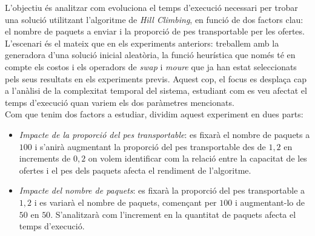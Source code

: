 \documentclass[a4paper]{article}
\begin{document}
	L'objectiu és analitzar com evoluciona el temps d'execució necessari per trobar una solució utilitzant l'algoritme de \textit{Hill Climbing}, en funció de dos factors clau: el nombre de paquets a enviar i la proporció de pes transportable per les ofertes. \\

	L'escenari és el mateix que en els experiments anteriors: treballem amb la generadora d'una solució inicial aleatòria, la funció heurística que només té en compte els costos i els operadors de \textit{swap} i \textit{moure} que ja han estat seleccionats pels seus resultats en els experiments previs. Aquest cop, el focus es desplaça cap a l'anàlisi de la complexitat temporal del sistema, estudiant com es veu afectat el temps d'execució quan variem els dos paràmetres mencionats. \\

	Com que tenim dos factors a estudiar, dividim aquest experiment en dues parts:
	\begin{itemize}
		\item \emph{Impacte de la proporció del pes transportable}: es fixarà el nombre de paquets a $100$ i s'anirà augmentant la proporció del pes transportable des de $1,2$ en increments de $0,2$ on volem identificar com la relació entre la capacitat de les ofertes i el pes dels paquets afecta el rendiment de l'algoritme.

		\item \emph{Impacte del nombre de paquets}: es fixarà la proporció del pes transportable a $1,2$ i es variarà el nombre de paquets, començant per $100$ i augmentant-lo de $50$ en $50$. S'analitzarà com l'increment en la quantitat de paquets afecta el temps d'execució.

	\end{itemize}
\end{document}
